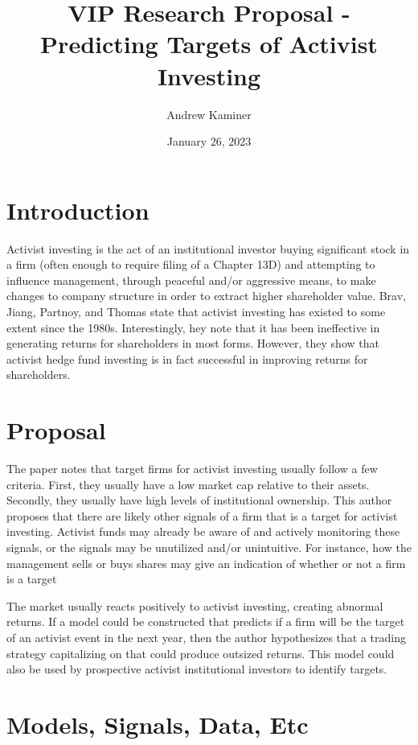 \documentclass[11pt,a4paper]{article}
\title{VIP Research Proposal - Predicting Targets of Activist Investing}
\author{Andrew Kaminer}
\date{January 26, 2023}
\begin{document}
\maketitle

\thispagestyle{empty}

\section{Introduction}

Activist investing is the act of an institutional investor buying significant
stock in a firm (often enough to require filing of a Chapter 13D) and attempting
to influence management, through peaceful and/or aggressive means, to make 
changes to company structure in order to extract higher shareholder value.
Brav, Jiang, Partnoy, and Thomas\cite{BravEtAll} state that activist investing
has existed to some extent since the 1980s. Interestingly, hey note that it has 
been ineffective in generating returns for shareholders in most forms. 
However, they show that activist hedge fund investing is in fact successful in 
improving returns for shareholders.

\section{Proposal}

The paper notes that target firms for activist investing usually follow a few
criteria. First, they usually have a low market cap relative to their assets.
Secondly, they usually have high levels of institutional ownership. This author
proposes that there are likely other signals of a firm that is a target for 
activist investing. Activist funds may already be aware of and actively 
monitoring these signals, or the signals may be unutilized and/or unintuitive.
For instance, how the management sells or buys shares may give an indication 
of whether or not a firm is a target

The market usually reacts positively to activist investing, creating abnormal
returns.\cite{BravEtAll} If a model could be constructed that predicts if a 
firm will be the target of an activist event in the next year, then the author
hypothesizes that a trading strategy capitalizing on that could produce outsized
returns. This model could also be used by prospective activist institutional
investors to identify targets.

\section{Models, Signals, Data, Etc}
\end{document}
